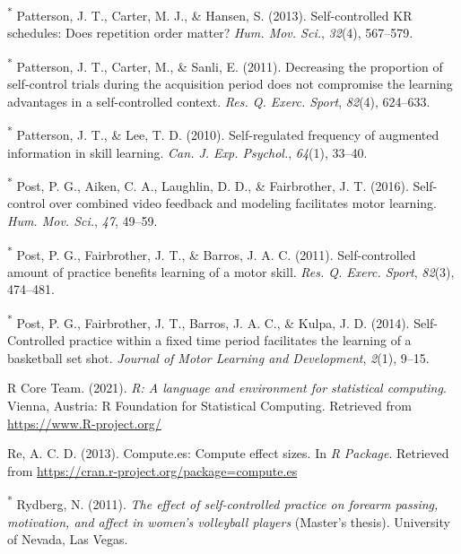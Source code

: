 \documentclass[
  english,
  man,floatsintext]{apa7}
\newlength{\cslhangindent}
\newlength{\cslentryspacingunit} %
\newenvironment{CSLReferences}[2] %
 {%
  \setlength{\parindent}{0pt}
  \ifodd #1
  \let\oldpar\par
  \def\par{\hangindent=\cslhangindent\oldpar}
  \fi
  \setlength{\parskip}{#2\cslentryspacingunit}
 }%
 {}
\begin{document}
\begin{CSLReferences}{1}{0}
\leavevmode{}%
\textsuperscript{*} Patterson, J. T., Carter, M. J., \& Hansen, S. (2013). Self-controlled {KR} schedules: Does repetition order matter? \emph{Hum. Mov. Sci.}, \emph{32}(4), 567--579.

\leavevmode{}%
\textsuperscript{*} Patterson, J. T., Carter, M., \& Sanli, E. (2011). Decreasing the proportion of self-control trials during the acquisition period does not compromise the learning advantages in a self-controlled context. \emph{Res. Q. Exerc. Sport}, \emph{82}(4), 624--633.

\leavevmode{}%
\textsuperscript{*} Patterson, J. T., \& Lee, T. D. (2010). Self-regulated frequency of augmented information in skill learning. \emph{Can. J. Exp. Psychol.}, \emph{64}(1), 33--40.

\leavevmode{}%
\textsuperscript{*} Post, P. G., Aiken, C. A., Laughlin, D. D., \& Fairbrother, J. T. (2016). Self-control over combined video feedback and modeling facilitates motor learning. \emph{Hum. Mov. Sci.}, \emph{47}, 49--59.

\leavevmode{}%
\textsuperscript{*} Post, P. G., Fairbrother, J. T., \& Barros, J. A. C. (2011). Self-controlled amount of practice benefits learning of a motor skill. \emph{Res. Q. Exerc. Sport}, \emph{82}(3), 474--481.

\leavevmode{}%
\textsuperscript{*} Post, P. G., Fairbrother, J. T., Barros, J. A. C., \& Kulpa, J. D. (2014). {Self-Controlled} practice within a fixed time period facilitates the learning of a basketball set shot. \emph{Journal of Motor Learning and Development}, \emph{2}(1), 9--15.

\leavevmode{}%
R Core Team. (2021). \emph{R: A language and environment for statistical computing}. Vienna, Austria: R Foundation for Statistical Computing. Retrieved from \url{https://www.R-project.org/}

\leavevmode{}%
Re, A. C. D. (2013). Compute.es: Compute effect sizes. In \emph{R Package}. Retrieved from \url{https://cran.r-project.org/package=compute.es}

\leavevmode{}%
\textsuperscript{*} Rydberg, N. (2011). \emph{The effect of self-controlled practice on forearm passing, motivation, and affect in women's volleyball players} (Master's thesis). University of Nevada, Las Vegas.


\end{CSLReferences}
\end{document}
